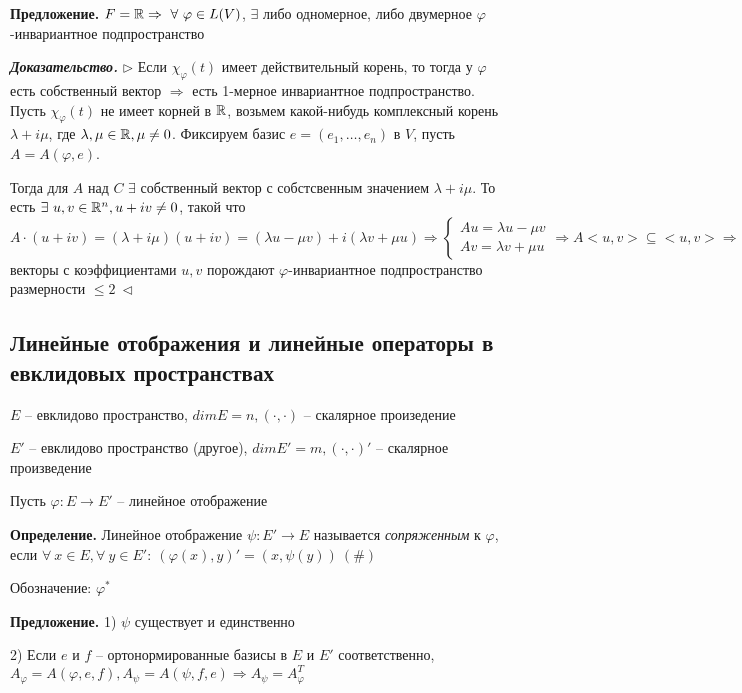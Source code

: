 \vspace{\baselineskip}
\textbf{Предложение.} $F = \mathbb{R} \Rightarrow \ \forall \ \varphi \in L(V)$, $\exists$ либо одномерное, либо двумерное $\varphi$-инвариантное подпространство

\vspace{\baselineskip}
\textbf{\textit{Доказательство.}} $\rhd$ Если $\chi_{\varphi} (t)$ имеет действительный корень, то тогда у $\varphi$ есть собственный вектор $\Rightarrow$ есть 1-мерное инвариантное подпространство. Пусть $\chi_{\varphi} (t)$ не имеет корней в $\mathbb{R}$, возьмем какой-нибудь комплексный корень $\lambda + i \mu$, где $\lambda, \mu \in \mathbb{R}, \mu \neq 0$. Фиксируем базис $e = (e_1, \dots, e_n)$ в $V$, пусть $A = A(\varphi, e)$. 

Тогда для $A$ над $C$ $\exists$ собственный вектор с собстсвенным значением $\lambda + i \mu$. То есть $\exists \ u, v \in \mathbb{R}^n, u + i v \neq 0$, такой что $A \cdot (u + iv) = (\lambda + i \mu) (u + iv) = (\lambda u - \mu v) + i (\lambda v + \mu u) \Rightarrow \begin{cases}
        Au = \lambda u - \mu v \\
        Av = \lambda v + \mu u
\end{cases} \Rightarrow A <u, v> \subseteq <u, v> \Rightarrow$ векторы с коэффициентами $u, v$ порождают $\varphi$-инвариантное подпространство размерности $\leq 2 \ \lhd$

\subsection{Линейные отображения и линейные операторы в евклидовых пространствах}

$E$ -- евклидово пространство, $dim E = n, ( \cdot, \cdot)$ -- скалярное произедение

$E'$ -- евклидово пространство (другое), $dim E' = m, (\cdot, \cdot)'$ -- скалярное произведение

Пусть $\varphi: E \rightarrow E'$ -- линейное отображение

\textbf{Определение.} Линейное отображение $\psi: E' \rightarrow E$ называется \textit{сопряженным} к $\varphi$, если $\forall \ x \in E, \forall \ y \in E': \ (\varphi(x), y)' = (x, \psi(y)) \ (\#)$

Обозначение: $\varphi^*$

\vspace{\baselineskip}
\textbf{Предложение.} 1) $\psi$ существует и единственно

2) Если $e$ и $f$ -- ортонормированные базисы в $E$ и $E'$ соответственно, $A_{\varphi} = A(\varphi, e, f), A_{\psi} = A(\psi, f, e) \Rightarrow A_{\psi} = A_{\varphi}^T$

